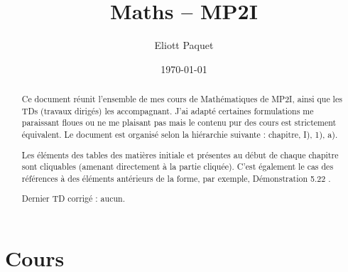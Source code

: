 \documentclass[a4paper,12pt]{report}
\title{Maths -- MP2I}
\author{Eliott Paquet}
\date{\today}
\newcommand{\ds}{\displaystyle}
\theoremstyle{break}
\theoremstyle{break}
\theoremstyle{break}
\theoremstyle{break}
\theoremstyle{break}
\theoremstyle{break}
\theoremstyle{break}
\theoremstyle{break}
\theoremstyle{break}
\theoremstyle{break}
\theoremstyle{break}
\theoremstyle{break}
\theoremstyle{break}
\theoremstyle{break}
\theoremstyle{break}
\theoremstyle{break}
\theoremstyle{break}
\theoremstyle{break}
\theoremstyle{break}
\theoremstyle{break}
\theoremstyle{break}
\theoremstyle{break}
\theoremstyle{break}
\theoremstyle{break}
\newcommand{\guillemets}[1]{\og #1 \fg{}}
\begin{document}
\renewcommand{\labelitemi}{\(\bullet\)}
\renewcommand{\labelenumi}{(\arabic{enumi})}

\everymath{\ds}

\maketitle

\begin{abstract}
	Ce document réunit l'ensemble de mes cours de Mathématiques de MP2I, ainsi que les TDs (travaux dirigés) les accompagnant. J'ai adapté certaines formulations me paraissant floues ou ne me plaisant pas mais le contenu pur des cours est strictement équivalent. Le document est organisé selon la hiérarchie suivante : chapitre, I), 1), a).

	Les éléments des tables des matières initiale et présentes au début de chaque chapitre sont cliquables (amenant directement à la partie cliquée). C'est également le cas des références à des éléments antérieurs de la forme, par exemple, \guillemets{Démonstration 5.22}.

	Dernier TD corrigé : aucun.
\end{abstract}

\dominitoc\tableofcontents

\part{Cours}








\end{document}
